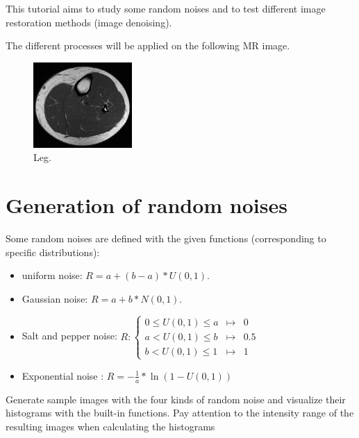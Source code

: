 \def\difficulty{2}

\begin{note}This tutorial aims to study some random noises and to test different image restoration methods (image denoising). 
\end{note}

\noindent The different processes will be applied on the following MR image.
\begin{figure}[H]
\centering\includegraphics[height=3.25cm]{jambe}
\caption{Leg.}
\label{fig:image_restoration_denoising:enonce:leg}
\end{figure}

\section{Generation of random noises}

Some random noises are defined with the given functions (corresponding to specific distributions): 
\begin{itemize}
	\item uniform noise: $R=a+(b-a)*U(0,1)$. 
	\item Gaussian noise: $R=a+b*N(0,1)$.
	\item Salt and pepper noise: $R : \left\{\begin{array}{ccc}
	0\leq U(0,1)\leq a &\mapsto & 0\\
	a<U(0,1)\leq b&\mapsto & 0.5\\
	b< U(0,1)\leq 1 &\mapsto & 1
	\end{array}\right.$
	\item Exponential noise : $R=\displaystyle -\frac{1}{a}*\ln(1-U(0,1))$
\end{itemize}

\begin{qbox}
Generate sample images with the four kinds of random noise and visualize their histograms with the built-in functions. Pay attention to the intensity range of the resulting images when calculating the histograms
\end{qbox}


